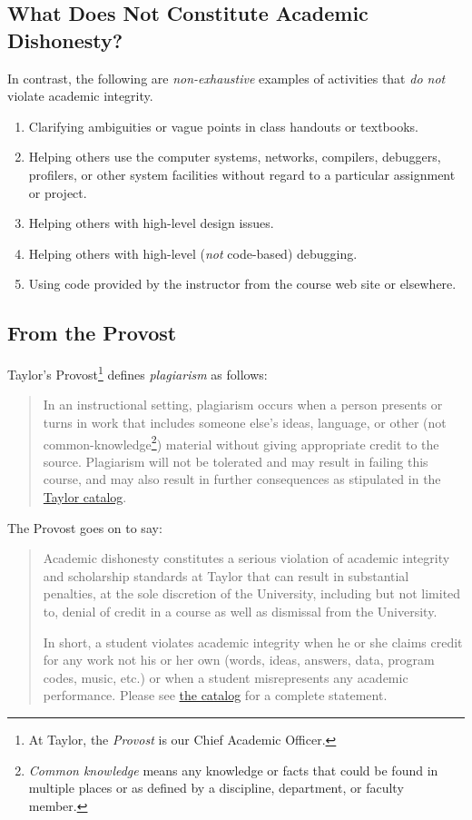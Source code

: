 \subsection{What Does Not Constitute Academic Dishonesty?}

In contrast, the following are \emph{non-exhaustive} examples of activities
that \emph{do not} violate academic integrity.

\begin{enumerate}
\item Clarifying ambiguities or vague points in class handouts or textbooks.
\item Helping others use the computer systems, networks, compilers, debuggers,
  profilers, or other system facilities without regard to a particular assignment or project.
\item Helping others with high-level design issues.
\item Helping others with high-level (\emph{not} code-based) debugging.
\item Using code provided by the instructor from the course web site or elsewhere.
\end{enumerate}

\subsection{From the Provost}

Taylor's Provost\footnote{At Taylor, the \emph{Provost} is our Chief Academic Officer.}
defines \emph{plagiarism} as follows:
\begin{quote}
  In an instructional setting,
  plagiarism occurs when a person presents or turns in work
  that includes someone else's ideas, language,
  or other (not common-knowledge\footnote{\emph{Common knowledge}
    means any knowledge or facts that could be found in multiple places
    or as defined by a discipline, department, or faculty member.}) material
  without giving appropriate credit to the source.
  Plagiarism will not be tolerated
  and may result in failing this course,
  and may also result in further consequences
  as stipulated in the
  \href{http://www.taylor.edu/academics/files/undergrad-catalog/current/catalog.pdf}{Taylor catalog}.
\end{quote}

The Provost goes on to say:
\begin{quote}
  Academic dishonesty constitutes a serious violation
  of academic integrity and scholarship standards at Taylor
  that can result in substantial penalties,
  at the sole discretion of the University,
  including but not limited to,
  denial of credit in a course as well as dismissal from the University.

  In short, a student violates academic integrity
  when he or she claims credit for any work not his or her own
  (words, ideas, answers, data, program codes, music, etc.)
  or when a student misrepresents any academic performance.
  Please see 
  \href{http://www.taylor.edu/academics/files/undergrad-catalog/current/catalog.pdf}%
  {the catalog} for a complete statement.
\end{quote}



